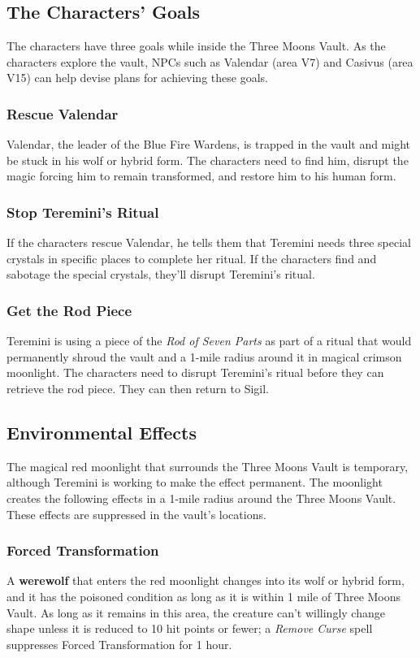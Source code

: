 \documentclass[10pt,a4paper,twoside,bg=print,twocolumn,openany,nodeprecatedcode]{dndbook}
\begin{document}
\subsection{The Characters' Goals}
The characters have three goals while inside the Three Moons Vault. As the characters explore the vault, NPCs such as Valendar (area V7) and Casivus (area V15) can help devise plans for achieving these goals.

\subsubsection{Rescue Valendar}
Valendar, the leader of the Blue Fire Wardens, is trapped in the vault and might be stuck in his wolf or hybrid form. The characters need to find him, disrupt the magic forcing him to remain transformed, and restore him to his human form.

\subsubsection{Stop Teremini's Ritual}
If the characters rescue Valendar, he tells them that Teremini needs three special crystals in specific places to complete her ritual. If the characters find and sabotage the special crystals, they'll disrupt Teremini's ritual.

\subsubsection{Get the Rod Piece}
Teremini is using a piece of the \textit{Rod of Seven Parts} as part of a ritual that would permanently shroud the vault and a 1-mile radius around it in magical crimson moonlight. The characters need to disrupt Teremini's ritual before they can retrieve the rod piece. They can then return to Sigil.

\subsection{Environmental Effects}
The magical red moonlight that surrounds the Three Moons Vault is temporary, although Teremini is working to make the effect permanent. The moonlight creates the following effects in a 1-mile radius around the Three Moons Vault. These effects are suppressed in the vault's locations.

\subsubsection{Forced Transformation}
A \textbf{werewolf} that enters the red moonlight changes into its wolf or hybrid form, and it has the poisoned condition as long as it is within 1 mile of Three Moons Vault. As long as it remains in this area, the creature can't willingly change shape unless it is reduced to 10 hit points or fewer; a \textit{Remove Curse} spell suppresses Forced Transformation for 1 hour.
\end{document}
